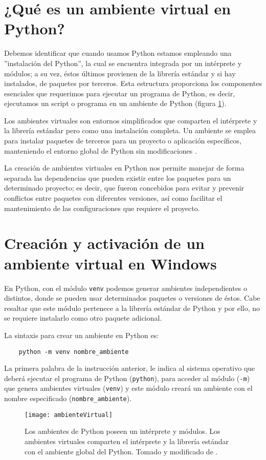 \section{¿Qué es un ambiente virtual en Python?}
Debemos identificar que cuando usamos Python estamos empleando una ''instalación del Python'', la cual se encuentra integrada por un intérprete y módulos; a su vez, éstos últimos provienen de la librería estándar y si hay instalados, de paquetes por terceros. Esta estructura proporciona los componentes esenciales que requerimos para ejecutar un programa de Python, es decir, ejecutamos un script o programa en un ambiente de Python (figura \ref{fig:ambienteVirtual}).\bigskip
	
Los ambientes virtuales son entornos simplificados que comparten el intérprete y la librería estándar pero como una instalación completa. Un ambiente se emplea para instalar paquetes de terceros para un proyecto o aplicación específicos, manteniendo el entorno global de Python sin modificaciones \citep{jolowicz2024}.\bigskip
	
La creación de ambientes virtuales en Python nos permite manejar de forma separada las dependencias que pueden existir entre los paquetes para un determinado proyecto; es decir, que fueron concebidos para evitar y prevenir conflictos entre paquetes con diferentes versiones, así como facilitar el mantenimiento de las configuraciones que requiere el proyecto.
	
\section{Creación y activación de un ambiente virtual en Windows}
En Python, con el módulo \texttt{venv} podemos generar ambientes independientes o distintos, donde se pueden usar determinados paquetes o versiones de éstos. Cabe resaltar que este módulo pertenece a la librería estándar de Python y por ello, no se requiere instalarlo como otro paquete adicional.\bigskip
	
La sintaxis para crear un ambiente en Python  es:
\begin{verbatim}
    python -m venv nombre_ambiente
\end{verbatim}
	
La primera palabra de la instrucción anterior, le indica al sistema operativo que deberá ejecutar el programa de Python (\texttt{python}), para acceder al módulo (\texttt{-m}) que genera ambientes virtuales (\texttt{venv}) y este módulo creará un ambiente con el nombre especificado (\texttt{nombre\_ambiente}).\bigskip
\begin{figure}[H]
\centering
\texttt{[image: ambienteVirtual]}
\caption{Los ambientes de Python poseen un intérprete y módulos. Los ambientes virtuales comparten el intérprete y la librería estándar con el ambiente global del Python. Tomado y modificado de \citet{jolowicz2024}.}
\label{fig:ambienteVirtual}
\end{figure}
	
